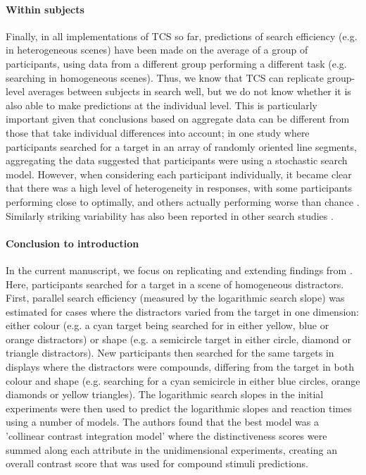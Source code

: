 \documentclass[smallextended]{svjour3}       %
\begin{document}
\paragraph{Within subjects}
Finally, in all implementations of TCS so far, predictions of search efficiency (e.g. in heterogeneous scenes) have been made on the average of a group of participants, using data from a different group performing a different task (e.g. searching in homogeneous scenes). Thus, we know that TCS can replicate group-level averages between subjects in search well, but we do not know whether it is also able to make predictions at the individual level. This is particularly important given that conclusions based on aggregate data can be different from those that take individual differences into account; in one study where participants searched for a target in an array of randomly oriented line segments, aggregating the data suggested that participants were using a stochastic search model. However, when considering each participant individually, it became clear that there was a high level of heterogeneity in responses, with some participants performing close to optimally, and others actually performing worse than chance \cite{nowakowska2017human}. Similarly striking variability has also been reported in other search studies \cite{irons2016choosing, irons2018characterizing}. 

\paragraph{Conclusion to introduction} 
In the current manuscript, we focus on replicating and extending findings from \cite{buetti2019predicting}. Here, participants searched for a target in a scene of homogeneous distractors. First, parallel search efficiency (measured by the logarithmic search slope) was estimated for cases where the distractors varied from the target in one dimension: either colour (e.g. a cyan target being searched for in either yellow, blue or orange distractors) or shape (e.g. a semicircle target in either circle, diamond or triangle distractors). New participants then searched for the same targets in displays where the distractors were compounds, differing from the target in both colour and shape (e.g. searching for a cyan semicircle in either blue circles, orange diamonds or yellow triangles). The logarithmic search slopes in the initial experiments were then used to predict the logarithmic slopes and reaction times using a number of models. The authors found that the best model was a 'collinear contrast integration model' where the distinctiveness scores were summed along each attribute in the unidimensional experiments, creating an overall contrast score that was used for compound stimuli predictions.
\end{document}
